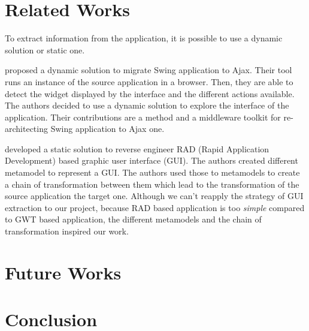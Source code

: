 \documentclass[conference]{IEEEtran}
\begin{document}
    
    
    
    \section{Related Works}
    \label{sec:related}
    

    
    To extract information from the application, it is possible to use a dynamic solution or static one. 
    
     \citet{samir2007swing2script} proposed a dynamic solution to migrate Swing application to Ajax.
    Their tool runs an instance of the source application in a browser.
    Then, they are able to detect the widget displayed by the interface and the different actions available.
    The authors decided to use a dynamic solution to explore the interface of the application.
    Their contributions are a method and a middleware toolkit for re-architecting Swing application to Ajax one.
    
    \citet{sanchez2014model} developed a static solution to reverse engineer RAD (Rapid Application Development) based graphic user interface (GUI).
    The authors created different metamodel to represent a GUI.
    The authors used those to metamodels to create a chain of transformation between them which lead to the transformation of 
        the source  application the target one.
    Although we can't reapply the strategy of GUI extraction to our project, because RAD based application is too \emph{simple} compared to GWT based application,
        the different metamodels and the chain of transformation inspired our work.
    
    
    \section{Future Works}
    \label{sec:future}
    
    
    \section{Conclusion}
    \label{sec:conclusion}
    
\end{document}
